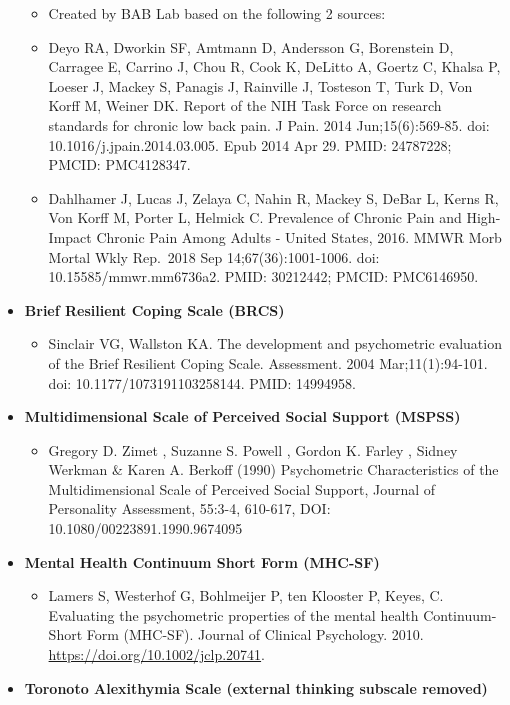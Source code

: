 \documentclass[
]{book}
\providecommand{\tightlist}{%
  \setlength{\itemsep}{0pt}\setlength{\parskip}{0pt}}
\begin{document}
\begin{itemize}
  \begin{itemize}
  \tightlist
  \item
    Created by BAB Lab based on the following 2 sources:
  \item
    Deyo RA, Dworkin SF, Amtmann D, Andersson G, Borenstein D, Carragee E, Carrino J, Chou R, Cook K, DeLitto A, Goertz C, Khalsa P, Loeser J, Mackey S, Panagis J, Rainville J, Tosteson T, Turk D, Von Korff M, Weiner DK. Report of the NIH Task Force on research standards for chronic low back pain. J Pain. 2014 Jun;15(6):569-85. doi: 10.1016/j.jpain.2014.03.005. Epub 2014 Apr 29. PMID: 24787228; PMCID: PMC4128347.
  \item
    Dahlhamer J, Lucas J, Zelaya C, Nahin R, Mackey S, DeBar L, Kerns R, Von Korff M, Porter L, Helmick C. Prevalence of Chronic Pain and High-Impact Chronic Pain Among Adults - United States, 2016. MMWR Morb Mortal Wkly Rep.~2018 Sep 14;67(36):1001-1006. doi: 10.15585/mmwr.mm6736a2. PMID: 30212442; PMCID: PMC6146950.
  \end{itemize}
\item
  \textbf{Brief Resilient Coping Scale (BRCS)}

  \begin{itemize}
  \tightlist
  \item
    Sinclair VG, Wallston KA. The development and psychometric evaluation of the Brief Resilient Coping Scale. Assessment. 2004 Mar;11(1):94-101. doi: 10.1177/1073191103258144. PMID: 14994958.
  \end{itemize}
\item
  \textbf{Multidimensional Scale of Perceived Social Support (MSPSS)}

  \begin{itemize}
  \tightlist
  \item
    Gregory D. Zimet , Suzanne S. Powell , Gordon K. Farley , Sidney Werkman \& Karen A. Berkoff (1990) Psychometric Characteristics of the Multidimensional Scale of Perceived Social Support, Journal of Personality Assessment, 55:3-4, 610-617, DOI: 10.1080/00223891.1990.9674095
  \end{itemize}
\item
  \textbf{Mental Health Continuum Short Form (MHC-SF)}

  \begin{itemize}
  \tightlist
  \item
    Lamers S, Westerhof G, Bohlmeijer P, ten Klooster P, Keyes, C. Evaluating the psychometric properties of the mental health Continuum-Short Form (MHC-SF). Journal of Clinical Psychology. 2010. \url{https://doi.org/10.1002/jclp.20741}.
  \end{itemize}
\item
  \textbf{Toronoto Alexithymia Scale (external thinking subscale removed)}


\end{itemize}
\end{document}
